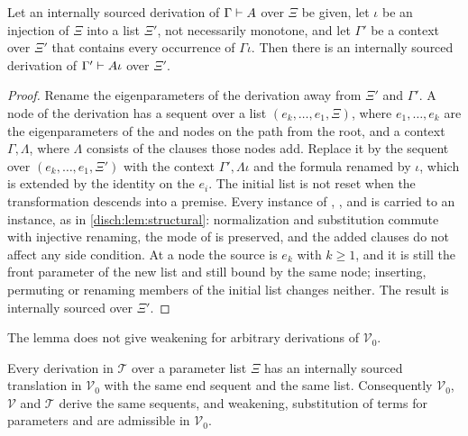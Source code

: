 \begin{lemma}
\label{disch:lem:internal}
Let an internally sourced derivation of $\Gamma\vdash A$ over $\Xi$ be
given, let $\iota$ be an injection of $\Xi$ into a list $\Xi'$, not
necessarily monotone, and let $\Gamma'$ be a context over $\Xi'$ that
contains every occurrence of $\Gamma\iota$. Then there is an internally
sourced derivation of $\Gamma'\vdash A\iota$ over $\Xi'$.
\end{lemma}

\begin{proof}
Rename the eigenparameters of the derivation away from $\Xi'$ and
$\Gamma'$. A node of the derivation has a sequent over a list
$(e_k,\dots,e_1,\Xi)$, where $e_1,\dots,e_k$ are the eigenparameters of
the  and  nodes on the path from the root,
and a context $\Gamma,\Lambda$, where $\Lambda$ consists of the clauses
those nodes add. Replace it by the sequent over $(e_k,\dots,e_1,\Xi')$
with the context $\Gamma',\Lambda\iota$ and the formula renamed by
$\iota$, which is extended by the identity on the $e_i$. The initial list
is not reset when the transformation descends into a premise. Every
instance of , ,  and
 is carried to an instance, as in
\cref{disch:lem:structural}: normalization and substitution commute with
injective renaming, the mode of  is preserved, and the
added clauses do not affect any side condition. At a  node
the source is $e_k$ with $k\geq 1$, and it is still the front parameter of
the new list and still bound by the same  node; inserting,
permuting or renaming members of the initial list changes neither. The
result is internally sourced over $\Xi'$.
\end{proof}

The lemma does not give weakening for arbitrary derivations of
$\mathcal V_0$.

\begin{theorem}
\label{disch:thm:newest}
Every derivation in $\mathcal T$ over a parameter list $\Xi$ has an
internally sourced translation in $\mathcal V_0$ with the same end sequent
and the same list. Consequently $\mathcal V_0$, $\mathcal V$ and
$\mathcal T$ derive the same sequents, and weakening, substitution of
terms for parameters and  are admissible in $\mathcal V_0$.
\end{theorem}

